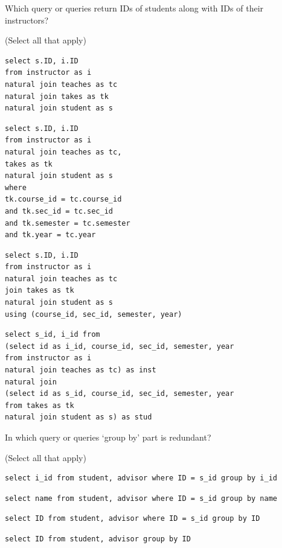 \documentclass[12pt, addpoints, answers]{exam}
\begin{document}
\begin{questions}
\begin{minipage}{\linewidth}
\question[4]
Which query or queries return IDs of students along with IDs of their instructors?\par\vspace{0.5em}
(Select all that apply)\par\vspace{0.5em}
\begin{checkboxes} 
    \choice \begin{verbatim}
select s.ID, i.ID
from instructor as i
natural join teaches as tc
natural join takes as tk
natural join student as s
    \end{verbatim}
    \CorrectChoice \begin{verbatim}
select s.ID, i.ID
from instructor as i
natural join teaches as tc,
takes as tk
natural join student as s
where
tk.course_id = tc.course_id
and tk.sec_id = tc.sec_id
and tk.semester = tc.semester
and tk.year = tc.year
    \end{verbatim}
    \CorrectChoice \begin{verbatim}
select s.ID, i.ID
from instructor as i
natural join teaches as tc
join takes as tk
natural join student as s
using (course_id, sec_id, semester, year)
    \end{verbatim}
    \CorrectChoice \begin{verbatim}
select s_id, i_id from
(select id as i_id, course_id, sec_id, semester, year
from instructor as i
natural join teaches as tc) as inst
natural join
(select id as s_id, course_id, sec_id, semester, year
from takes as tk
natural join student as s) as stud
    \end{verbatim}
\end{checkboxes}
\end{minipage}\vspace{1em}

\begin{minipage}{\linewidth}
\question[4]
In which query or queries ‘group by’ part is redundant?\par\vspace{0.5em}
(Select all that apply)\par\vspace{0.5em}
\begin{checkboxes} 
    \choice \begin{verbatim}
select i_id from student, advisor where ID = s_id group by i_id
    \end{verbatim}
    \choice \begin{verbatim}
select name from student, advisor where ID = s_id group by name
    \end{verbatim}
    \CorrectChoice \begin{verbatim}
select ID from student, advisor where ID = s_id group by ID
    \end{verbatim}
    \choice \begin{verbatim}
select ID from student, advisor group by ID
    \end{verbatim}
\end{checkboxes}
\end{minipage}\vspace{1em}

\end{questions}
\end{document}
